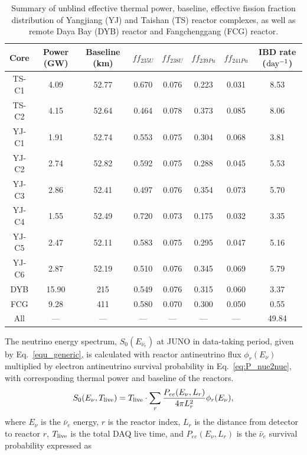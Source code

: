 \begin{table}[ht]
    \centering
    \begin{tabular}{c|c|c|c|c|c|c|c}\hline
        Core    &   Power (GW)   &   Baseline (km)   &   $ff_{235U}$ &   $ff_{238U}$ & $ff_{239Pu}$ & $ff_{241Pu}$ & IBD rate ($\rm day^{-1}$)    \\ \hline
        TS-C1    & 4.09 & 52.77 & 0.670 & 0.076 & 0.223 & 0.031 & 8.53\\ 
        TS-C2    & 4.15 & 52.64 & 0.464 & 0.078 & 0.373 & 0.085 & 8.06\\ 
        YJ-C1    & 1.91 & 52.74 & 0.553 & 0.075 & 0.304 & 0.068 & 3.81\\ 
        YJ-C2    & 2.74 & 52.82 & 0.592 & 0.075 & 0.288 & 0.045 & 5.53\\ 
        YJ-C3    & 2.86 & 52.41 & 0.497 & 0.076 & 0.354 & 0.073 & 5.70\\ 
        YJ-C4    & 1.55 & 52.49 & 0.720 & 0.073 & 0.175 & 0.032 & 3.35\\ 
        YJ-C5    & 2.47 & 52.11 & 0.583 & 0.075 & 0.295 & 0.047 & 5.16\\ 
        YJ-C6    & 2.87 & 52.19 & 0.510 & 0.076 & 0.345 & 0.069 & 5.79\\ 
        DYB      & 15.90 & 215  & 0.549 & 0.076 & 0.315 & 0.060 & 3.37\\ 
        FCG      & 9.28 & 411   & 0.580 & 0.070 & 0.300 & 0.050 & 0.55\\ \hline
        All      & —     & —     & —     & —     & —     & —     & 49.84\\ \hline
    \end{tabular}
    \caption{Summary of unblind effective thermal power, baseline, effective fission fraction distribution of Yangjiang (YJ) and Taishan (TS) reactor complexes, as well as remote Daya Bay (DYB) reactor and Fangchenggang (FCG) reactor. }
    \label{tab:ReactorInfo}%
\end{table}%
The neutrino energy spectrum, $S_0(E_{\bar{\nu}_e})$ at JUNO in data-taking period, given by Eq.~\eqref{equ_generic}, is calculated with reactor antineutrino flux $\phi_r(E_{\nu})$ multiplied by electron antineutrino survival probability in Eq.~\eqref{eq:P_nue2nue}, with corresponding thermal power and baseline of the reactors.
\begin{equation}\label{equ_generic}
    S_0(E_{\nu},T_{\rm live})  = T_{\rm live} \cdot \sum_r \frac{P_{ee}(E_{\nu},L_{r})}{ 4\pi L^2_{r}}\phi_r(E_{\nu}),
\end{equation}
where $E_{\nu}$ is the $\bar\nu_e$ energy, $r$ is the reactor index, $L_{r}$ is the distance from detector to reactor $r$, $T_{\rm live}$ is the total DAQ live time, and $P_{ee}(E_{\nu},L_{r})$ is the $\bar{\nu}_e$ survival probability expressed as
